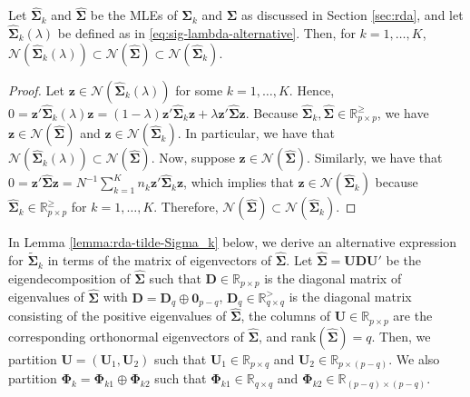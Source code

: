 \documentclass[11pt]{article}
\begin{document}
\begin{lemma}\label{lemma:null-spaces}
Let $\widehat{\bm \Sigma}_k$ and $\widehat{\bm \Sigma}$ be the MLEs of $\bm \Sigma_k$ and $\bm \Sigma$ as discussed in Section \ref{sec:rda}, and let $\widehat{\bm \Sigma}_k(\lambda)$ be defined as in \eqref{eq:sig-lambda-alternative}. Then, for $k = 1, \ldots, K$, $\mathcal{N}(\widehat{\bm \Sigma}_k(\lambda)) \subset \mathcal{N}(\widehat{\bm \Sigma}) \subset \mathcal{N}(\widehat{\bm \Sigma}_k)$.
\end{lemma}
\begin{proof}
Let $\bm z \in \mathcal{N}(\widehat{\bm \Sigma}_k(\lambda))$ for some $k = 1, \ldots, K$. Hence, $0 = \bm z' \widehat{\bm \Sigma}_k(\lambda) \bm z = (1 - \lambda) \bm z' \widehat{\bm \Sigma}_k \bm z + \lambda \bm z' \widehat{\bm \Sigma} \bm z$. Because $\widehat{\bm \Sigma}_k, \widehat{\bm \Sigma}\in \mathbb{R}_{p \times p}^{\ge}$, we have $\bm z \in \mathcal{N}(\widehat{\bm \Sigma})$ and $\bm z \in \mathcal{N}(\widehat{\bm \Sigma}_k)$. In particular, we have that $\mathcal{N}(\widehat{\bm \Sigma}_k(\lambda)) \subset \mathcal{N}(\widehat{\bm \Sigma})$. Now, suppose $\bm z \in \mathcal{N}(\widehat{\bm \Sigma})$. Similarly, we have that $0 = \bm z' \widehat{\bm \Sigma} \bm z = N^{-1} \sum_{k = 1}^K n_k \bm z' \widehat{\bm \Sigma}_k \bm z$, which implies that $\bm z \in \mathcal{N}(\widehat{\bm \Sigma}_k)$ because $\widehat{\bm \Sigma}_k \in \mathbb{R}_{p \times p}^{\ge}$ for $k = 1, \ldots, K$. Therefore, $\mathcal{N}(\widehat{\bm \Sigma}) \subset \mathcal{N}(\widehat{\bm \Sigma}_k)$.
\end{proof}

In Lemma \ref{lemma:rda-tilde-Sigma_k} below, we derive an alternative expression for $\tilde{\bm \Sigma}_k$ in terms of the matrix of eigenvectors of $\widehat{\bm \Sigma}$. Let $\widehat{\bm \Sigma} = \bm U \bm D \bm U'$ be the eigendecomposition of $\widehat{\bm \Sigma}$ such that $\bm D \in \mathbb{R}_{p \times p}$ is the diagonal matrix of eigenvalues of $\widehat{\bm \Sigma}$ with $\bm D = \bm D_q \oplus \bm 0_{p-q}$, $\bm D_q \in \mathbb{R}_{q \times q}^{>}$ is the diagonal matrix consisting of the positive eigenvalues of $\widehat{\bm \Sigma}$,  the columns of $\bm U \in \mathbb{R}_{p \times p}$ are the corresponding orthonormal eigenvectors of $\widehat{\bm \Sigma}$, and rank$(\widehat{\bm \Sigma}) = q$. Then, we partition $\bm U = (\bm U_1, \bm U_2)$ such that $\bm U_1 \in \mathbb{R}_{p \times q}$ and $\bm U_2 \in \mathbb{R}_{p \times (p - q)}$. We also partition $\bm \Phi_k = \bm \Phi_{k1} \oplus \bm \Phi_{k2}$ such that $\bm \Phi_{k1} \in \mathbb{R}_{q \times q}$ and $\bm \Phi_{k2} \in \mathbb{R}_{(p-q) \times (p-q)}$.
\end{document}
